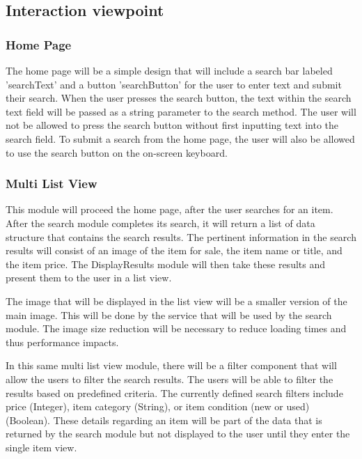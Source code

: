 \documentclass[journal,compsoc, 10pt, draftclsnofoot, onecolumn]{IEEEtran}
\begin{document}
\subsection{Interaction viewpoint}

\subsubsection*{Home Page}
The home page will be a simple design that will include a search bar labeled 
'searchText' and a button 'searchButton' for the user to enter text and 
submit their search. When the user presses the search button, the text within 
the search text field will be passed as a string parameter to the search method.
The user will not be allowed to press the search button without first inputting 
text into the search field. To submit a search from the home page, the user will 
also be allowed to use the search button on the on-screen keyboard. 

\subsubsection*{Multi List View}
This module will proceed the home page, after the user searches for an item. 
After the search module completes its search, it will return a list of data 
structure that contains the search results. The pertinent information in the 
search results will consist of an image of the item for sale, the item name or 
title, and the item price. The DisplayResults module will then take these 
results and present them to the user in a list view. \newline

The image that will be displayed in the list view will be a smaller version of 
the main image. This will be done by the service that will be used by the 
search module. The image size reduction will be necessary to reduce loading 
times and thus performance impacts. \newline

In this same multi list view module, there will be a filter component that will
 allow the users to filter the search results. The users will be able to filter 
the results based on predefined criteria. The currently defined search filters 
include price (Integer), item category (String), or item condition (new or used) 
(Boolean). These details regarding an item will be part of the data that is 
returned by the search module but not displayed to the user until they enter 
the single item view.
\end{document}
